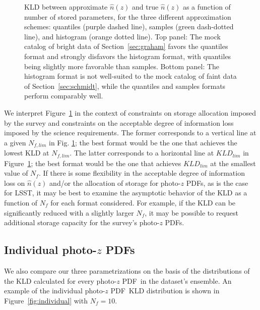 \documentclass[\docopts]{\docclass}
\newcommand{\pz}{photo-$z$ PDF}
\newcommand{\mgdata}{bright\xspace}
\newcommand{\ssdata}{faint\xspace}
\begin{document}
\begin{figure}
\begin{center}
    \caption{KLD between approximate $\hat{n}(z)$ and true $\hat{n}(z)$ as a 
function of number of stored parameters, for the three different approximation 
schemes: quantiles (purple dashed line), samples (green dash-dotted line), and 
histogram (orange dotted line).
    Top panel: The mock catalog of \mgdata data of Section~\ref{sec:graham} 
favors the quantiles format and strongly disfavors the histogram format, with 
quantiles being slightly more favorable than samples.
    Bottom panel: The histogram format is not well-suited to the mock catalog 
of \ssdata data of Section~\ref{sec:schmidt}, while the quantiles and samples 
formats perform comparably well.
    \label{fig:kld}}
  \end{center}
\end{figure}

We interpret Figure~\ref{fig:kld} in the context of constraints on storage 
allocation imposed by the survey and constraints on the acceptable degree of 
information loss imposed by the science requirements.
The former corresponds to a vertical line at a given $N_{f, lim}$ in Fig. 
\ref{fig:kld}; the best format would be the one that achieves the lowest KLD at 
$N_{f, lim}$.
The latter corresponds to a horizontal line at $KLD_{lim}$ in 
Figure~\ref{fig:kld}; the best format would be the one that achieves 
$KLD_{lim}$ at the smallest value of $N_{f}$.
If there is some flexibility in the acceptable degree of information loss on 
$\hat{n}(z)$ and/or the allocation of storage for \pz s, as is the case for 
LSST, it may be best to examine the asymptotic behavior of the KLD as a 
function of $N_{f}$ for each format considered.
For example, if the KLD can be significantly reduced with a slightly larger 
$N_{f}$, it may be possible to request additional storage capacity for the 
survey's \pz s.

\subsection{Individual \pz s}
\label{sec:individual_results}

We also compare our three parametrizations on the basis of the distributions of 
the KLD calculated for every \pz\ in the dataset's ensemble.
An example of the individual \pz\ KLD distribution is shown in 
Figure~\ref{fig:individual} with $N_{f}=10$.
\end{document}
